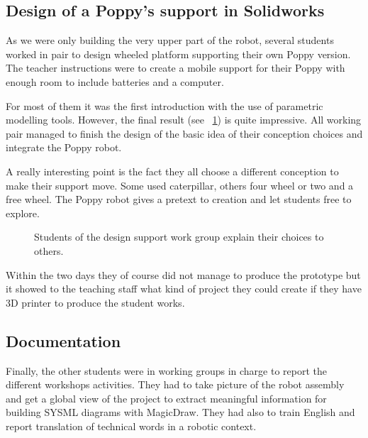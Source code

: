 \subsection{Design of a Poppy's support in Solidworks} %

As we were only building the very upper part of the robot, several students worked in pair to design wheeled platform supporting their own Poppy version. The teacher instructions were to create a mobile support for their Poppy with enough room to include batteries and a computer.

For most of them it was the first introduction with the use of parametric modelling tools. However, the final result (see \figurename~\ref{fig:saintonge_support}) is quite impressive. All working pair managed to finish the design of the basic idea of their conception choices and integrate the Poppy robot.

A really interesting point is the fact they all choose a different conception to make their support move. Some used caterpillar, others four wheel or two and a free wheel. The Poppy robot gives a pretext to creation and let students free to explore.

\begin{figure}[tb]
\centering
    \hfil
    \hfil
    \caption{Students of the design support work group explain their choices to others.}
    \label{fig:saintonge_support}
\end{figure}

Within the two days they of course did not manage to produce the prototype but it showed to the teaching staff what kind of project they could create if they have 3D printer to produce the student works.

\subsection{Documentation } %

Finally, the other students were in working groups in charge to report the different workshops activities. They had to take picture of the robot assembly and get a global view of the project to extract meaningful information for building SYSML diagrams with MagicDraw. They had also to train English and report translation of technical words in a robotic context.

